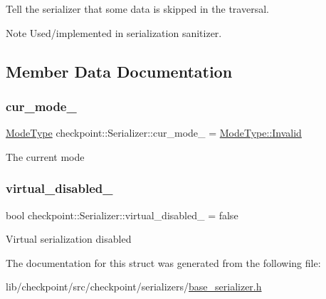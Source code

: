 Tell the serializer that some data is skipped in the traversal. 

\begin{DoxyNote}{Note}
Used/implemented in serialization sanitizer. 
\end{DoxyNote}


\subsection{Member Data Documentation}
\mbox{\label{structcheckpoint_1_1_serializer_a89a1f207ad5ff75654cb6d48f432be37}} 
\subsubsection{\texorpdfstring{cur\+\_\+mode\+\_\+}{cur\_mode\_}}
{\footnotesize\ttfamily \hyperlink{namespacecheckpoint_ae2509499ccd8b1dc48fb535bf8aa3059}{Mode\+Type} checkpoint\+::\+Serializer\+::cur\+\_\+mode\+\_\+ = \hyperlink{namespacecheckpoint_ae2509499ccd8b1dc48fb535bf8aa3059a4bbb8f967da6d1a610596d7257179c2b}{Mode\+Type\+::\+Invalid}\hspace{0.3cm}{\ttfamily [protected]}}

The current mode \mbox{\label{structcheckpoint_1_1_serializer_a46ef3c0da77d80853882a7cad641c2af}} 
\subsubsection{\texorpdfstring{virtual\+\_\+disabled\+\_\+}{virtual\_disabled\_}}
{\footnotesize\ttfamily bool checkpoint\+::\+Serializer\+::virtual\+\_\+disabled\+\_\+ = false\hspace{0.3cm}{\ttfamily [protected]}}

Virtual serialization disabled 

The documentation for this struct was generated from the following file\+:\begin{DoxyCompactItemize}
\item 
lib/checkpoint/src/checkpoint/serializers/\hyperlink{base__serializer_8h}{base\+\_\+serializer.\+h}\end{DoxyCompactItemize}
